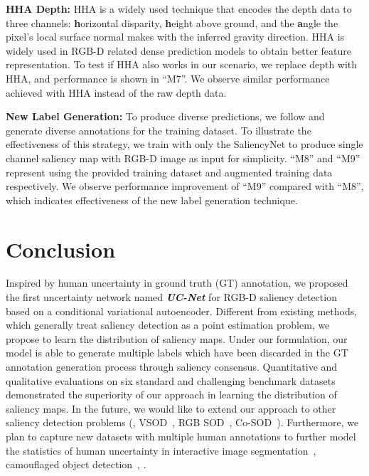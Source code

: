 \documentclass[10pt,twocolumn,letterpaper]{article}
\begin{document}
\noindent\textbf{HHA  Depth:}
HHA \cite{gupta2014learning} is a widely used technique that encodes the depth data to three channels: \textbf{h}orizontal disparity, \textbf{h}eight above ground, and the \textbf{a}ngle the pixel’s local surface normal makes with the inferred gravity direction. HHA is widely used in RGB-D related dense prediction models \cite{Du_2019_CVPR, han2017cnns} to obtain better feature representation. To test if HHA also works in our scenario, we replace depth with HHA, and performance is shown in \enquote{M7}. We observe similar performance achieved with HHA instead of the raw depth data.

\noindent\textbf{New Label Generation:}
To produce diverse predictions, we follow \cite{hide_and_seek-iccv2017} and generate diverse annotations for
the training dataset. To illustrate the effectiveness of this strategy, we train with only the SaliencyNet to produce single channel saliency map with RGB-D image as input for simplicity.
\enquote{M8} and \enquote{M9} represent using the provided training dataset and augmented training data respectively. We observe performance improvement of \enquote{M9} compared with \enquote{M8},
which indicates effectiveness of the new label generation technique. 







\section{Conclusion}
\vspace{-5pt}
Inspired by human uncertainty in ground truth (GT) annotation, we proposed the first uncertainty network named \textit{\textbf{UC-Net}} for RGB-D saliency detection based on a conditional variational autoencoder.
Different from existing methods, which generally treat saliency detection as a point estimation problem, we propose to learn the distribution of saliency maps. 
Under our formulation, our model is able to generate multiple labels which have been discarded in the GT annotation generation process through saliency consensus. 
Quantitative and qualitative evaluations on six standard and challenging benchmark datasets demonstrated the superiority of our approach in learning the distribution of saliency maps.
In the future, we would like to extend our approach to other saliency detection problems (\eg, VSOD~\cite{fan2019shifting}, RGB SOD~\cite{fan2018salient,zhao2019egnet}, Co-SOD~\cite{fan2020taking}).
Furthermore, we plan to capture new datasets with multiple human annotations to further model the statistics of human uncertainty in interactive image segmentation~\cite{fClick20CVPR}, camouflaged object detection~\cite{fan2020Camouflage}, \etc.
\end{document}
